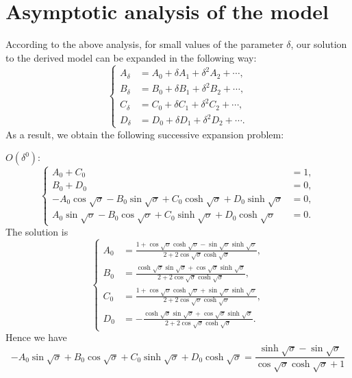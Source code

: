 \documentclass{svjour3}                     %
\begin{document}
\section{Asymptotic analysis of the model}

According to the above analysis, for small values of the parameter $\delta$, our solution to the derived model can be expanded in the following way:
\begin{equation}
    \left\{\begin{aligned}
        A_\delta &= A_0 + \delta A_1 + \delta^2 A_2 + \cdots, \\
        B_\delta &= B_0 + \delta B_1 + \delta^2 B_2 + \cdots, \\
        C_\delta &= C_0 + \delta C_1 + \delta^2 C_2 + \cdots, \\
        D_\delta &= D_0 + \delta D_1 + \delta^2 D_2 + \cdots. 
    \end{aligned}\right.
\end{equation}
As a result, we obtain the following successive expansion problem:

\noindent
$O(\delta^0)$:
\begin{equation}
    \left\{\begin{aligned}
        A_0 + C_0 &= 1, \\
        B_0 + D_0 &= 0, \\
        - A_0 \cos{\sqrt{\sigma}} - B_0 \sin{\sqrt{\sigma}} + C_0 \cosh{\sqrt{\sigma}} + D_0 \sinh{\sqrt{\sigma}} &= 0, \\
        A_0 \sin{\sqrt{\sigma}} - B_0 \cos{\sqrt{\sigma}} + C_0 \sinh{\sqrt{\sigma}} + D_0 \cosh{\sqrt{\sigma}} &= 0.
    \end{aligned}\right.
\end{equation}
The solution is
\begin{equation}
    \left\{\begin{aligned}
        A_0 &= \frac{1 + \cos\sqrt{\sigma} \cosh\sqrt{\sigma} - \sin\sqrt{\sigma} \sinh\sqrt{\sigma} }{2 + 2 \cos\sqrt{\sigma} \cosh\sqrt{\sigma} }, \\
        B_0 &= \frac{\cosh\sqrt{\sigma} \sin\sqrt{\sigma} + \cos\sqrt{\sigma} \sinh\sqrt{\sigma} }{2 + 2 \cos\sqrt{\sigma} \cosh\sqrt{\sigma} }, \\
        C_0 &= \frac{1 + \cos\sqrt{\sigma} \cosh\sqrt{\sigma} + \sin\sqrt{\sigma} \sinh\sqrt{\sigma} }{2 + 2 \cos\sqrt{\sigma} \cosh\sqrt{\sigma} }, \\
        D_0 &= -\frac{\cosh\sqrt{\sigma} \sin\sqrt{\sigma} + \cos\sqrt{\sigma} \sinh\sqrt{\sigma} }{2 + 2 \cos\sqrt{\sigma} \cosh\sqrt{\sigma} }.
    \end{aligned}\right.
\end{equation}
Hence we have
\begin{equation}
    - A_0 \sin{\sqrt{\sigma}} + B_0 \cos{\sqrt{\sigma}} + C_0 \sinh{\sqrt{\sigma}} + D_0 \cosh{\sqrt{\sigma}} = \frac{\sinh\sqrt{\sigma }-\sin\sqrt{\sigma }}{\cos\sqrt{\sigma } \cosh\sqrt{\sigma }+1}
\end{equation}
\end{document}
